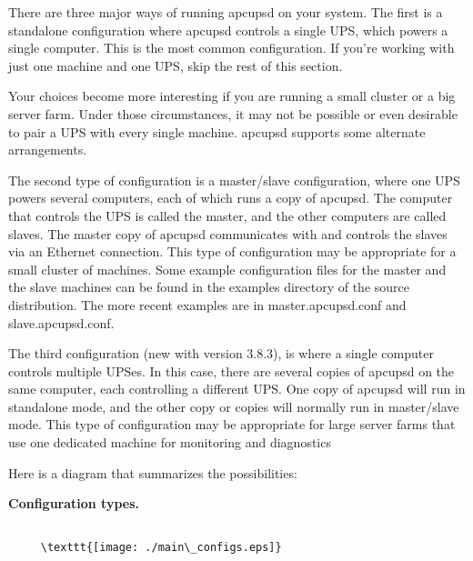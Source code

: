 \label{Choosing-a-Configuration-Type}

\label{index-Choosing-a-Configuration-Type-13}
\label{index-Configuration-Type-14}
There are three major ways of running apcupsd on your system. The first is a
standalone configuration where apcupsd controls a single UPS, which powers a
single computer.  This is the most common configuration.  If you're working
with just one machine and one UPS, skip the rest of this section.  

Your choices become more interesting if you are running a small cluster or a
big server farm.  Under those circumstances, it may not be possible or even
desirable to pair a UPS with every single machine.  apcupsd supports some
alternate arrangements.  

The second type of configuration is a master/slave configuration, where one
UPS powers several computers, each of which runs a copy of apcupsd.  The
computer that controls the UPS is called the master, and the other computers
are called slaves.  The master copy of apcupsd communicates with and controls
the slaves via an Ethernet connection.  This type of configuration may be
appropriate for a small cluster of machines.  Some example configuration files
for the master and the slave machines can be found in the examples directory
of the source distribution.  The more recent examples are in
master.apcupsd.conf and slave.apcupsd.conf.  

The third configuration (new with version 3.8.3), is where a single computer
controls multiple UPSes. In this case, there are several copies of apcupsd on
the same computer, each controlling a different UPS. One copy of apcupsd will
run in standalone mode, and the other copy or copies will normally run in
master/slave mode.  This type of configuration may be appropriate for large
server farms that use one dedicated machine for monitoring and diagnostics  

Here is a diagram that summarizes the possibilities: 

\label{Configuration-types_005f}

{\bf Configuration types.}  

\footnotesize
\begin{verbatim}
\end{verbatim}
\normalsize

\footnotesize
\begin{verbatim}
     \texttt{[image: ./main\_configs.eps]}
\end{verbatim}
\normalsize

